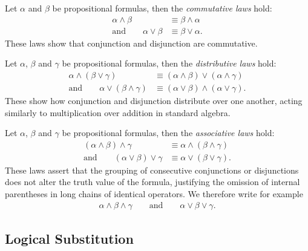 \begin{examples}
\begin{exampleenumerate}
        \item\label{example:logic:commutativity} Let $\alpha$ and $\beta$ be propositional formulas, then the \emph{commutative laws} hold:
        \begin{align}
            \alpha\land\beta&\equiv\beta\land\alpha\\ \text{and}\qquad \alpha\lor\beta&\equiv\beta\lor\alpha.
        \end{align}
        These laws show that conjunction and disjunction are commutative.

        \item\label{example:logic:distributivity} Let $\alpha$, $\beta$ and $\gamma$ be propositional formulas, then the \emph{distributive laws} hold:
        \begin{align}
            \alpha\land(\beta\lor\gamma)&\equiv(\alpha\land\beta)\lor(\alpha\land\gamma)\\ \text{and}\qquad \alpha\lor(\beta\land\gamma)&\equiv(\alpha\lor\beta)\land(\alpha\lor\gamma).
        \end{align}
        These show how conjunction and disjunction distribute over one another, acting similarly to multiplication over addition in standard algebra.

        \item\label{example:logic:associativity} Let $\alpha$, $\beta$ and $\gamma$ be propositional formulas, then the \emph{associative laws} hold:
        \begin{align}
            (\alpha\land\beta)\land\gamma&\equiv\alpha\land(\beta\land\gamma)\\ \text{and}\qquad (\alpha\lor\beta)\lor\gamma&\equiv\alpha\lor(\beta\lor\gamma).
        \end{align}
        These laws assert that the grouping of consecutive conjunctions or disjunctions does not alter the truth value of the formula, justifying the omission of internal parentheses in long chains of identical operators. We therefore write for example 
        \begin{align}
            \alpha\land\beta\land\gamma \qquad \text{and} \qquad \alpha\lor\beta\lor\gamma.
        \end{align}
    \end{exampleenumerate}
\end{examples}

\subsection{Logical Substitution}

